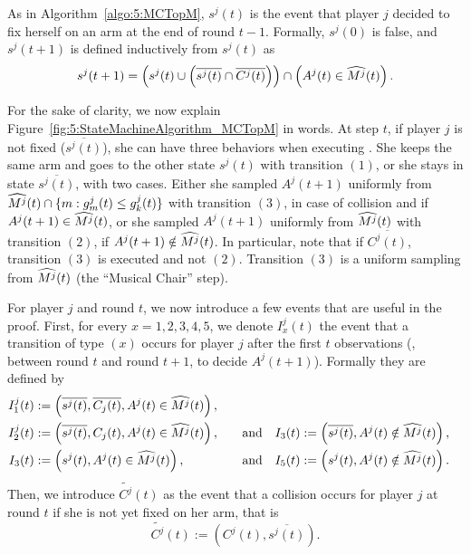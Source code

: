 
As in Algorithm~\ref{algo:5:MCTopM}, $s^j(t)$ is the event that player $j$ decided to fix herself on an arm at the end of round $t-1$.
Formally, $s^j(0)$ is false, and $s^j(t+1)$ is defined inductively from $s^j(t)$ as
\begin{equation}
    s^j(t+1) =
    \left( s^j(t) \cup \left( \overline{s^j(t)} \cap \overline{C^j(t)} \right) \right)
    \cap \left( A^j(t) \in \widehat{M^j}(t) \right).
\end{equation}

For the sake of clarity, we now explain Figure~\ref{fig:5:StateMachineAlgorithm_MCTopM} in words. At step $t$, if player $j$ is not fixed ($\overline{s^j(t)}$), she can have three behaviors when executing \MCTopM.
She keeps the same arm and goes to the other state $s^j(t)$ with transition $(1)$,
or she stays in state $\overline{s^j(t)}$,
with two cases.
Either she sampled $A^j(t+1)$ uniformly
from $\widehat{M^j}(t) \cap \{ m : g_m^j(t) \leq g_k^j(t) \}$
with transition $(3)$,
in case of collision and if $A^j(t+1) \in \widehat{M^j}(t)$,
or she sampled $A^j(t+1)$ uniformly
from $\widehat{M^j}(t)$ with transition $(2)$,
if $A^j(t+1) \notin \widehat{M^j}(t)$.
In particular, note that if $\overline{C^j(t)}$, transition $(3)$ is executed and not $(2)$.
%
Transition $(3)$ is a uniform sampling from $\widehat{M^j}(t)$ (the ``Musical Chair'' step).


For player $j$ and round $t$, we now introduce a few events that are useful in the proof. First, for every $x=1,2,3,4,5$, we denote $I_x^j(t)$ the event that a transition of type $(x)$ occurs for player $j$ after the first $t$ observations (\ie, between round $t$ and round $t+1$, to decide $A^j(t+1)$).
Formally they are defined by
\begin{align*}
  I_1^j(t) &:= \left(\overline{s^j(t)},\overline{C_j(t)}, A^j(t) \in \widehat{M^j}(t)\right), \\
  I_2^j(t) &:= \left(\overline{s^j(t)},C_j(t), A^j(t) \in \widehat{M^j}(t)\right),
  \ \ \ &\text{and} \ \ \
  I_3(t) &:= \left(\overline{s^j(t)},A^j(t) \notin \widehat{M^j}(t)\right), \\
  I_3(t) &:= \left(s^j(t),A^j(t) \in \widehat{M^j}(t)\right),
  \ \ \ &\text{and} \ \ \
  I_5(t) &:= \left(s^j(t),A^j(t) \notin \widehat{M^j}(t)\right).
\end{align*}
%
Then, we introduce $\widetilde{C^j}(t)$ as the event that a collision occurs for player $j$ at round $t$ if she is not yet fixed on her arm, that is
\begin{equation}
    \widetilde{C^j}(t) := \left(C^j(t), \overline{s^j(t)}\right).
\end{equation}


